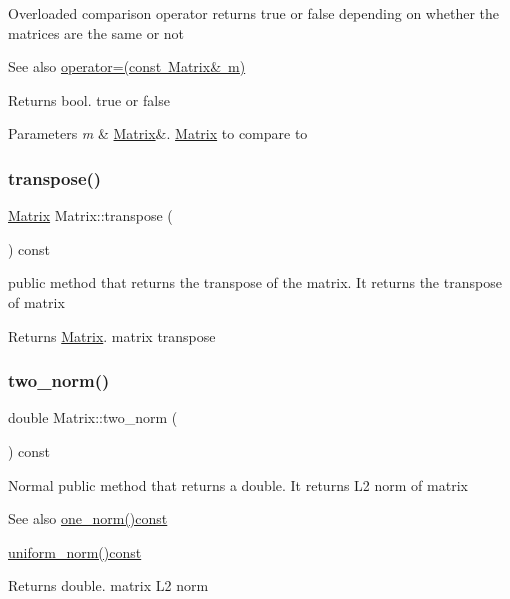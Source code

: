 Overloaded comparison operator returns true or false depending on whether the matrices are the same or not \begin{DoxySeeAlso}{See also}
\mbox{\hyperlink{class_matrix_aea5a06385f646eb4a63929fae6fa3e14}{operator=(const Matrix\& m)}} 
\end{DoxySeeAlso}
\begin{DoxyReturn}{Returns}
bool. true or false 
\end{DoxyReturn}

\begin{DoxyParams}{Parameters}
{\em m} & \mbox{\hyperlink{class_matrix}{Matrix}}\&. \mbox{\hyperlink{class_matrix}{Matrix}} to compare to \\
\hline
\end{DoxyParams}
\mbox{\label{class_matrix_a759661b75b9681f3a89ff75e27933b3a}} 
\subsubsection{\texorpdfstring{transpose()}{transpose()}}
{\footnotesize\ttfamily \mbox{\hyperlink{class_matrix}{Matrix}} Matrix\+::transpose (\begin{DoxyParamCaption}{ }\end{DoxyParamCaption}) const}

public method that returns the transpose of the matrix. It returns the transpose of matrix \begin{DoxyReturn}{Returns}
\mbox{\hyperlink{class_matrix}{Matrix}}. matrix transpose 
\end{DoxyReturn}
\mbox{\label{class_matrix_aac496af05ec7aa26afc2b9c6d0ab8b66}} 
\subsubsection{\texorpdfstring{two\+\_\+norm()}{two\_norm()}}
{\footnotesize\ttfamily double Matrix\+::two\+\_\+norm (\begin{DoxyParamCaption}{ }\end{DoxyParamCaption}) const}

Normal public method that returns a double. It returns L2 norm of matrix \begin{DoxySeeAlso}{See also}
\mbox{\hyperlink{class_matrix_af4d468252f3ecbbcaa5726c76e332b4c}{one\+\_\+norm()const}} 

\mbox{\hyperlink{class_matrix_a43066c7fe6418aad40170b85415063e8}{uniform\+\_\+norm()const}} 
\end{DoxySeeAlso}
\begin{DoxyReturn}{Returns}
double. matrix L2 norm 
\end{DoxyReturn}
\mbox{\label{class_matrix_a43066c7fe6418aad40170b85415063e8}} 
